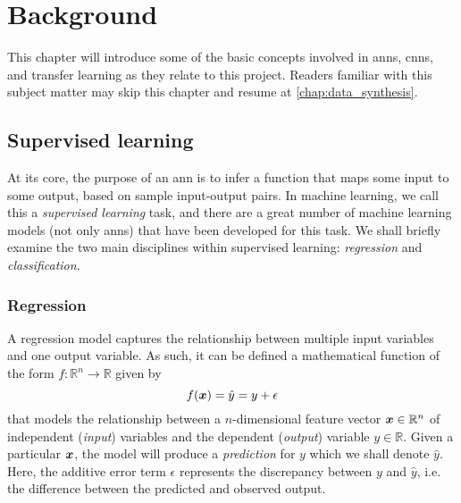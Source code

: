 \documentclass[../main.tex]{subfiles}
\begin{document}
\chapter{Background}
This chapter will introduce some of the basic concepts involved in \glspl{ann}, \glspl{cnn}, and transfer learning as they relate to this project.
Readers familiar with this subject matter may skip this chapter and resume at \cref{chap:data_synthesis}.

\section{Supervised learning}
At its core, the purpose of an \gls{ann} is to infer a function that maps some input to some output, based on sample input-output pairs.
In machine learning, we call this a \emph{supervised learning} task, and there are a great number of machine learning models (not only \glspl{ann}) that have been developed for this task.
We shall briefly examine the two main disciplines within supervised learning: \emph{regression} and \emph{classification}.

\subsection{Regression}
\label{sec:regression}
A regression model captures the relationship between multiple input variables and one output variable. 
As such, it can be defined a mathematical function of the form $f:\mathbb{R}^n\rightarrow \mathbb{R}$ given by
\begin{equation}
    \label{eq:reg_model}
    f({\bm{x}}) = \hat{y} = y + \epsilon
\end{equation}
that models the relationship between a $n$-dimensional feature vector ${\bm{x}} \in \mathbb{R}^n$ of independent (\emph{input}) variables and the dependent (\emph{output}) variable $y \in \mathbb{R}$. 
Given a particular ${\bm{x}}$, the model will produce a \emph{prediction} for $y$ which we shall denote $\hat{y}$.
Here, the additive error term $\epsilon$ represents the discrepancy between $y$ and $\hat{y}$, i.e. the difference between the predicted and observed output.
\end{document}
